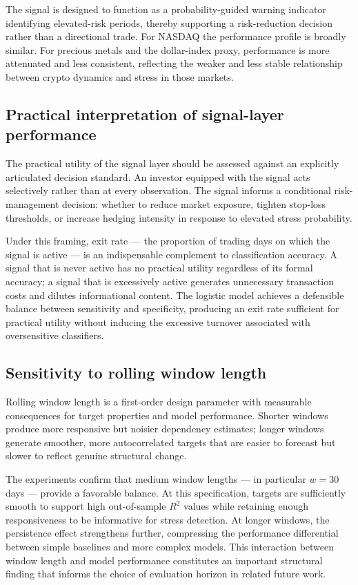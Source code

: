 The signal is designed to function as a probability-guided warning indicator identifying elevated-risk periods, thereby supporting a risk-reduction decision rather than a directional trade. For NASDAQ the performance profile is broadly similar. For precious metals and the dollar-index proxy, performance is more attenuated and less consistent, reflecting the weaker and less stable relationship between crypto dynamics and stress in those markets.

\subsection{Practical interpretation of signal-layer performance}

The practical utility of the signal layer should be assessed against an explicitly articulated decision standard. An investor equipped with the signal acts selectively rather than at every observation. The signal informs a conditional risk-management decision: whether to reduce market exposure, tighten stop-loss thresholds, or increase hedging intensity in response to elevated stress probability.

Under this framing, exit rate --- the proportion of trading days on which the signal is active --- is an indispensable complement to classification accuracy. A signal that is never active has no practical utility regardless of its formal accuracy; a signal that is excessively active generates unnecessary transaction costs and dilutes informational content. The logistic model achieves a defensible balance between sensitivity and specificity, producing an exit rate sufficient for practical utility without inducing the excessive turnover associated with oversensitive classifiers.

\subsection{Sensitivity to rolling window length}

Rolling window length is a first-order design parameter with measurable consequences for target properties and model performance. Shorter windows produce more responsive but noisier dependency estimates; longer windows generate smoother, more autocorrelated targets that are easier to forecast but slower to reflect genuine structural change.

The experiments confirm that medium window lengths --- in particular $w = 30$ days --- provide a favorable balance. At this specification, targets are sufficiently smooth to support high out-of-sample $R^2$ values while retaining enough responsiveness to be informative for stress detection. At longer windows, the persistence effect strengthens further, compressing the performance differential between simple baselines and more complex models. This interaction between window length and model performance constitutes an important structural finding that informs the choice of evaluation horizon in related future work.

